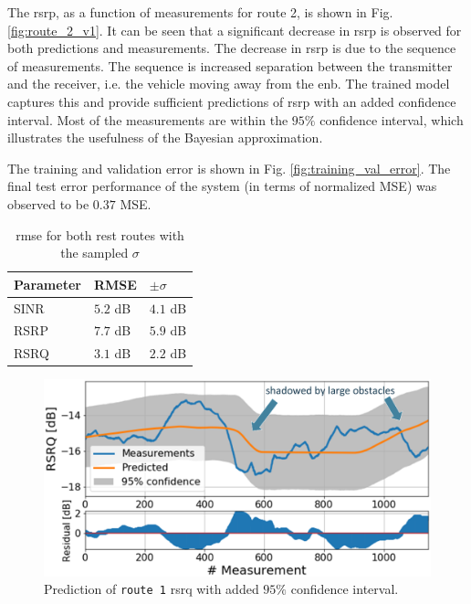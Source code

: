 The \gls{rsrp}, as a function of measurements for route 2, is shown in Fig. \ref{fig:route_2_v1}. It can be seen that a significant decrease in \gls{rsrp} is observed for both predictions and measurements. The decrease in \gls{rsrp} is due to the sequence of measurements. The sequence is increased separation between the transmitter and the receiver, i.e. the vehicle moving away from the \gls{enb}. The trained model captures this and provide sufficient predictions of \gls{rsrp} with an added confidence interval. Most of the measurements are within the $95\%$ confidence interval, which illustrates the usefulness of the Bayesian approximation. 

The training and validation error is shown in Fig. \ref{fig:training_val_error}. The final test error performance of the system (in terms of normalized MSE) was observed to be $\mathbf{0.37}$ MSE. 

\def\arraystretch{1.5}
\begin{table}[]
\centering
\begin{tabular}{@{}lll@{}}
\toprule
\textbf{Parameter} & RMSE   & $\pm \sigma$ \\ \midrule
SINR               & $5.2$ dB & $4.1$ dB       \\
RSRP               & $7.7$ dB & $5.9$ dB       \\
RSRQ               & $3.1$ dB & $2.2$ dB       \\ \bottomrule
\end{tabular}
\caption{\gls{rmse} for both rest routes with the sampled $\sigma$ }\label{tab:rmse_error_v1}
\end{table}



\begin{figure}
    \centering
    \includegraphics{chapters/part_pathloss/drive_test_minimzation_paper/route_1_predictions_5ab708662d60543b24f857a1_annotated.eps}
    \caption{Prediction of \texttt{route 1} \gls{rsrq} with added $95\%$ confidence interval.}
    \label{fig:route_1_v1}
\end{figure}


